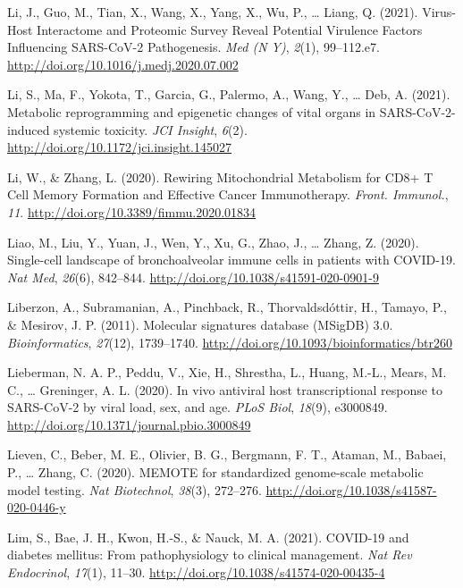 \documentclass[12pt,twoside,openany,\mydriver]{thesis}  %
\begin{document}
\leavevmode\hypertarget{ref-li_virus-host_2021}{}%
Li, J., Guo, M., Tian, X., Wang, X., Yang, X., Wu, P., \ldots{} Liang, Q. (2021). Virus-Host Interactome and Proteomic Survey Reveal Potential Virulence Factors Influencing SARS-CoV-2 Pathogenesis. \emph{Med (N Y)}, \emph{2}(1), 99--112.e7. \url{http://doi.org/10.1016/j.medj.2020.07.002}

\leavevmode\hypertarget{ref-li_metabolic_2021}{}%
Li, S., Ma, F., Yokota, T., Garcia, G., Palermo, A., Wang, Y., \ldots{} Deb, A. (2021). Metabolic reprogramming and epigenetic changes of vital organs in SARS-CoV-2-induced systemic toxicity. \emph{JCI Insight}, \emph{6}(2). \url{http://doi.org/10.1172/jci.insight.145027}

\leavevmode\hypertarget{ref-li_rewiring_2020}{}%
Li, W., \& Zhang, L. (2020). Rewiring Mitochondrial Metabolism for CD8+ T Cell Memory Formation and Effective Cancer Immunotherapy. \emph{Front. Immunol.}, \emph{11}. \url{http://doi.org/10.3389/fimmu.2020.01834}

\leavevmode\hypertarget{ref-liao_single-cell_2020}{}%
Liao, M., Liu, Y., Yuan, J., Wen, Y., Xu, G., Zhao, J., \ldots{} Zhang, Z. (2020). Single-cell landscape of bronchoalveolar immune cells in patients with COVID-19. \emph{Nat Med}, \emph{26}(6), 842--844. \url{http://doi.org/10.1038/s41591-020-0901-9}

\leavevmode\hypertarget{ref-liberzon_molecular_2011}{}%
Liberzon, A., Subramanian, A., Pinchback, R., Thorvaldsdóttir, H., Tamayo, P., \& Mesirov, J. P. (2011). Molecular signatures database (MSigDB) 3.0. \emph{Bioinformatics}, \emph{27}(12), 1739--1740. \url{http://doi.org/10.1093/bioinformatics/btr260}

\leavevmode\hypertarget{ref-lieberman_vivo_2020}{}%
Lieberman, N. A. P., Peddu, V., Xie, H., Shrestha, L., Huang, M.-L., Mears, M. C., \ldots{} Greninger, A. L. (2020). In vivo antiviral host transcriptional response to SARS-CoV-2 by viral load, sex, and age. \emph{PLoS Biol}, \emph{18}(9), e3000849. \url{http://doi.org/10.1371/journal.pbio.3000849}

\leavevmode\hypertarget{ref-lieven_memote_2020}{}%
Lieven, C., Beber, M. E., Olivier, B. G., Bergmann, F. T., Ataman, M., Babaei, P., \ldots{} Zhang, C. (2020). MEMOTE for standardized genome-scale metabolic model testing. \emph{Nat Biotechnol}, \emph{38}(3), 272--276. \url{http://doi.org/10.1038/s41587-020-0446-y}

\leavevmode\hypertarget{ref-lim_covid-19_2021}{}%
Lim, S., Bae, J. H., Kwon, H.-S., \& Nauck, M. A. (2021). COVID-19 and diabetes mellitus: From pathophysiology to clinical management. \emph{Nat Rev Endocrinol}, \emph{17}(1), 11--30. \url{http://doi.org/10.1038/s41574-020-00435-4}
\end{document}
